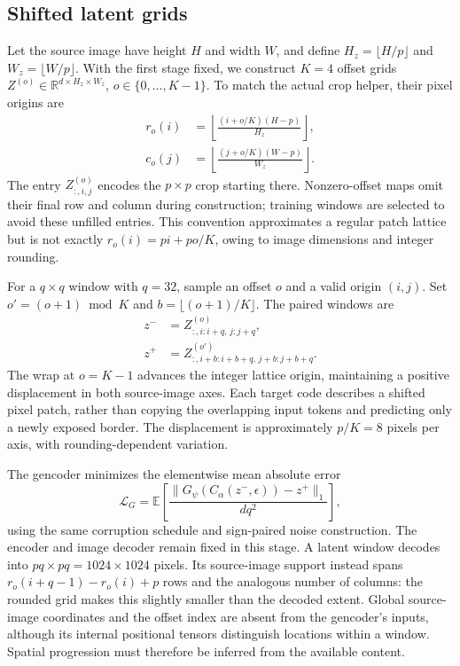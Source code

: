 \subsection{Shifted latent grids}

Let the source image have height $H$ and width $W$, and define $H_z=\lfloor H/p\rfloor$ and $W_z=\lfloor W/p\rfloor$. With the first stage fixed, we construct $K=4$ offset grids $Z^{(o)}\in\mathbb{R}^{d\times H_z\times W_z}$, $o\in\{0,\ldots,K-1\}$. To match the actual crop helper, their pixel origins are
\begin{align}
  r_o(i)&=\left\lfloor\frac{(i+o/K)(H-p)}{H_z}\right\rfloor,\\
  c_o(j)&=\left\lfloor\frac{(j+o/K)(W-p)}{W_z}\right\rfloor.
  \label{eq:regae-grid-origins}
\end{align}
The entry $Z^{(o)}_{:,i,j}$ encodes the $p\times p$ crop starting there. Nonzero-offset maps omit their final row and column during construction; training windows are selected to avoid these unfilled entries. This convention approximates a regular patch lattice but is not exactly $r_o(i)=pi+po/K$, owing to image dimensions and integer rounding.

For a $q\times q$ window with $q=32$, sample an offset $o$ and a valid origin $(i,j)$. Set $o'=(o+1)\bmod K$ and $b=\lfloor(o+1)/K\rfloor$. The paired windows are
\begin{align}
  z^-&=Z^{(o)}_{:,i:i+q,\,j:j+q},\\
  z^+&=Z^{(o')}_{:,i+b:i+b+q,\,j+b:j+b+q}.
  \label{eq:regae-shift-pair}
\end{align}
The wrap at $o=K-1$ advances the integer lattice origin, maintaining a positive displacement in both source-image axes. Each target code describes a shifted pixel patch, rather than copying the overlapping input tokens and predicting only a newly exposed border. The displacement is approximately $p/K=8$ pixels per axis, with rounding-dependent variation.

The gencoder minimizes the elementwise mean absolute error
\begin{equation}
  \mathcal{L}_{G}
  =\mathbb{E}\left[
    \frac{\|G_\psi(C_\alpha(z^-,\epsilon))-z^+\|_1}{dq^2}
  \right],
  \label{eq:regae-gencoder-loss}
\end{equation}
using the same corruption schedule and sign-paired noise construction. The encoder and image decoder remain fixed in this stage. A latent window decodes into $pq\times pq=1024\times1024$ pixels. Its source-image support instead spans $r_o(i+q-1)-r_o(i)+p$ rows and the analogous number of columns: the rounded grid makes this slightly smaller than the decoded extent. Global source-image coordinates and the offset index are absent from the gencoder's inputs, although its internal positional tensors distinguish locations within a window. Spatial progression must therefore be inferred from the available content.

